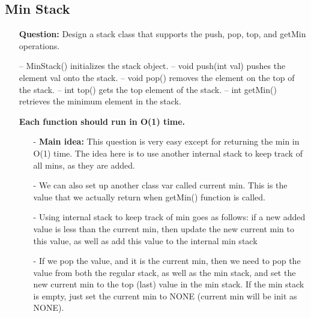 \documentclass[12pt]{article}
\begin{document}
\subsection{Min Stack}
\begin{enumerate}
  \item[] \textbf{Question:} Design a stack class that supports the push, pop, top, and getMin operations.

-- MinStack() initializes the stack object.
-- void push(int val) pushes the element val onto the stack.
-- void pop() removes the element on the top of the stack.
-- int top() gets the top element of the stack.
-- int getMin() retrieves the minimum element in the stack.

\textbf{Each function should run in O(1) time.}
    
    \begin{enumerate}
      \item[-] \textbf{Main idea:} This question is very easy except for returning the min in O(1) time. The idea here is to use another internal stack to keep track of all mins, as they are added.
      \item[-] We can also set up another class var called current min. This is the value that we actually return when getMin() function is called. 
      \item[-] Using internal stack to keep track of min goes as follows: if a new added value is less than the current min, then update the new current min to this value, as well as add this value to the internal min stack 
      \item[-] If we pop the value, and it is the current min, then we need to pop the value from both the regular stack, as well as the min stack, and set the new current min to the top (last) value in the min stack. If the min stack is empty, just set the current min to NONE (current min will be init as NONE).
    \end{enumerate}
\end{enumerate}
\end{document}
